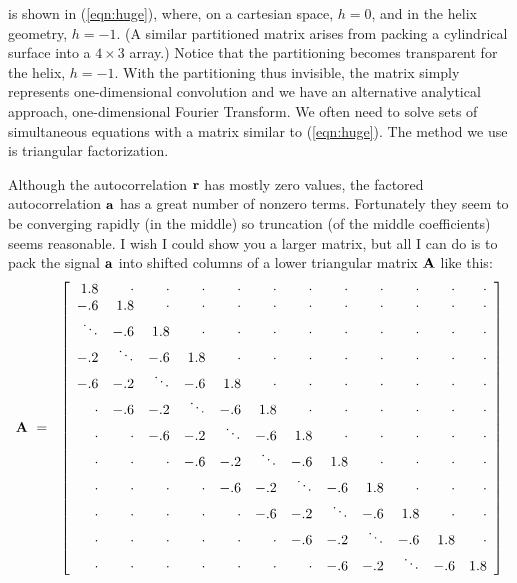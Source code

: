 is shown in (\ref{eqn:huge}),
where, 
on a cartesian space, $h=0$,
and in the helix geometry, $h=-1$.
(A similar partitioned matrix arises from packing
a cylindrical surface into a $4\times3$ array.)
Notice that the partitioning becomes transparent for the helix, $h=-1$.
With the partitioning thus invisible, the matrix
simply represents one-dimensional convolution
and we have an alternative analytical approach,
one-dimensional Fourier Transform.
We often need to solve sets of simultaneous equations
with a matrix similar to (\ref{eqn:huge}).
The method we use is triangular factorization.
\par
Although the autocorrelation $\bold r$ has mostly zero values,
the factored autocorrelation $\bold a$ has a great number of nonzero terms.
Fortunately they seem to be converging rapidly (in the middle)
so truncation (of the middle coefficients) seems reasonable.
I wish I could show you a larger matrix, but all I can do is to pack
the signal $\bold a$ into shifted columns of
a lower triangular matrix $\bold A$ like this:
\begin{equation}
\bold A \ = \ \ 
\left[
\begin{array}{rrrrrrrrrrrr}
   1.8& \cdot& \cdot& \cdot& \cdot& \cdot& \cdot& \cdot& \cdot& \cdot& \cdot& \cdot\\
   -.6&   1.8& \cdot& \cdot& \cdot& \cdot& \cdot& \cdot& \cdot& \cdot& \cdot& \cdot\\
\ddots&   -.6&   1.8& \cdot& \cdot& \cdot& \cdot& \cdot& \cdot& \cdot& \cdot& \cdot\\
   -.2&\ddots&   -.6&   1.8& \cdot& \cdot& \cdot& \cdot& \cdot& \cdot& \cdot& \cdot\\
   -.6&   -.2&\ddots&   -.6&   1.8& \cdot& \cdot& \cdot& \cdot& \cdot& \cdot& \cdot\\
 \cdot&   -.6&   -.2&\ddots&   -.6&   1.8& \cdot& \cdot& \cdot& \cdot& \cdot& \cdot\\
 \cdot& \cdot&   -.6&   -.2&  \ddots& -.6&   1.8& \cdot& \cdot& \cdot& \cdot& \cdot\\
 \cdot& \cdot& \cdot&   -.6&  -.2& \ddots&   -.6&   1.8& \cdot& \cdot& \cdot& \cdot\\
 \cdot& \cdot& \cdot& \cdot&  -.6&    -.2&\ddots&   -.6&   1.8& \cdot& \cdot& \cdot\\
 \cdot& \cdot& \cdot& \cdot& \cdot&   -.6&   -.2&\ddots&   -.6&   1.8& \cdot& \cdot\\
 \cdot& \cdot& \cdot& \cdot& \cdot& \cdot&   -.6&   -.2&\ddots&   -.6&   1.8& \cdot\\
 \cdot& \cdot& \cdot& \cdot& \cdot& \cdot& \cdot&   -.6&   -.2&\ddots&   -.6&  1.8
\end{array}
\right]
\label{eqn:lapfacmat}
\end{equation}
